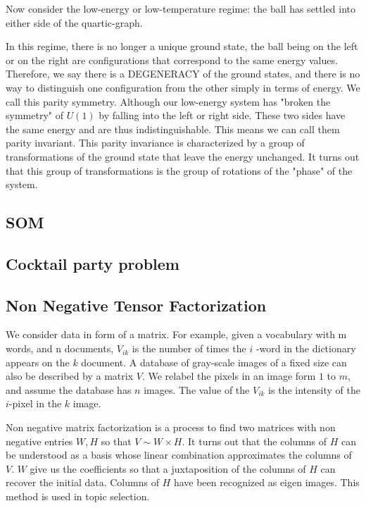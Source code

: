 \documentclass[11pt,letterpaper]{report}
\begin{document}
Now consider the low-energy or low-temperature regime: the ball has settled into either side of the quartic-graph. 

In this regime, there is no longer a unique ground state, the ball being on the left or on the right are configurations that correspond to the same energy values. Therefore, we say there is a DEGENERACY of the ground states, and there is no way to distinguish one configuration from the other simply in terms of energy. We call this parity symmetry. Although our low-energy system has "broken the symmetry" of $U(1)$ by falling into the left or right side. These two sides have the same energy and are thus indistinguishable. This means we can call them parity invariant. This parity invariance is characterized by a group of transformations of the ground state that leave the energy unchanged. It turns out that this group of transformations is the group of rotations of the "phase" of the system. 




\subsection{SOM}
 \subsection{Cocktail party problem}
 \subsection{Non Negative Tensor Factorization}
 
We consider data in form of a matrix. For example, given a vocabulary with  m  words, and  n  documents,  $V_{ik}$ is  the number of times the  $i$ -word in the dictionary appears on the  $k$  document.
A database of gray-scale images of a fixed size can also be described by a matrix $V$.  We relabel the pixels in an image form $1$ to $ m$, and assume the  database has $n$ images. The value of the $V_{ik}$ is the intensity of the $i$-pixel in the $k$ image. 

Non negative matrix factorization is a process to find two matrices with non negative entries $W,H$ so that $V\sim W\times H$. It turns out that the columns of $H$ can be understood as a basis whose linear combination approximates the columns of $V$. $W$ give us the coefficients so that a juxtaposition of the columns of  $H$ can recover the initial data. Columns of $H$ have been recognized as eigen images. This method is used in topic selection.  
 
\end{document}
